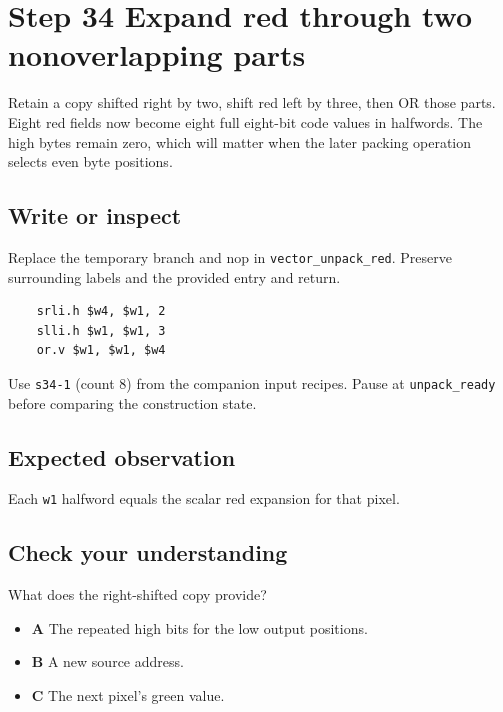 \section{Step 34 Expand red through two nonoverlapping parts}\label{rgb-s34}

Retain a copy shifted right by two, shift red left by three, then OR those parts. Eight red fields now become eight full eight-bit code values in halfwords. The high bytes remain zero, which will matter when the later packing operation selects even byte positions.

\subsection{Write or inspect}
Replace the temporary branch and nop in \texttt{vector\_unpack\_red}. Preserve surrounding labels and the provided entry and return.

\begin{verbatim}
    srli.h $w4, $w1, 2
    slli.h $w1, $w1, 3
    or.v $w1, $w1, $w4
\end{verbatim}
Use \texttt{s34-1} (count 8) from the companion input recipes. Pause at \texttt{unpack\_ready} before comparing the construction state.

\subsection{Expected observation}
Each \texttt{w1} halfword equals the scalar red expansion for that pixel.

\subsection{Check your understanding}
What does the right-shifted copy provide?

\begin{itemize}
  \item \textbf{A} The repeated high bits for the low output positions.
  \item \textbf{B} A new source address.
  \item \textbf{C} The next pixel's green value.
\end{itemize}
